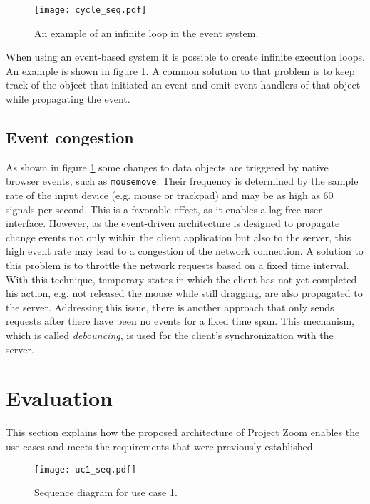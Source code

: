 \begin{figure}
\begin{center}
\texttt{[image: cycle\_seq.pdf]}
\caption{An example of an infinite loop in the event system.}
\label{fig:eventcycle}
\end{center}
\end{figure}

When using an event-based system it is possible to create infinite execution loops. An example is shown in figure \ref{fig:eventcycle}. A common solution to that problem is to keep track of the object that initiated an event and omit event handlers of that object while propagating the event. \cite{Sommers_2009}

\section{Event congestion}
As shown in figure \ref{fig:eventcycle} some changes to data objects are triggered by native browser events, such as \texttt{mousemove}. Their frequency is determined by the sample rate of the input device (e.g. mouse or trackpad) and may be as high as 60 signals per second. This is a favorable effect, as it enables a lag-free user interface. However, as the event-driven architecture is designed to propagate change events not only within the client application but also to the server, this high event rate may lead to a congestion of the network connection. 
A solution to this problem is to throttle the network requests based on a fixed time interval. With this technique, temporary states in which the client has not yet completed his action, e.g. not released the mouse while still dragging, are also propagated to the server. Addressing this issue, there is another approach that only sends requests after there have been no events for a fixed time span. This mechanism, which is called \textit{debouncing}, is used for the client's synchronization with the server. \cite{Walsh_2012}


\chapter{Evaluation}

This section explains how the proposed architecture of Project Zoom enables the use cases and meets the requirements that were previously established.

\begin{figure}
\begin{center}
\texttt{[image: uc1\_seq.pdf]}
\caption{Sequence diagram for use case 1.}
\label{fig:evaluc1}
\end{center}
\end{figure}

